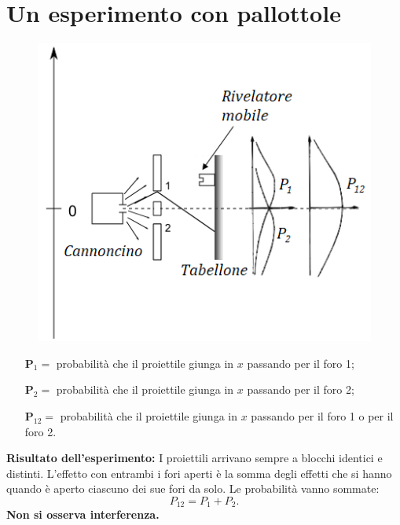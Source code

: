 \section*{Un esperimento con pallottole}
\begin{figure}[!htbp]
\begin{center}
\includegraphics[width=.6\textwidth]{immagini/cap_2/fig_2_1.png}
\end{center}
\end{figure}
\begin{itemize}
\item[\textbf{P$_1=$} ]probabilità che il proiettile giunga in $x$ passando per il foro 1;
\item[\textbf{P$_2=$} ]probabilità che il proiettile giunga in $x$ passando per il foro 2;
\item[\textbf{P$_{12}=$} ]probabilità che il proiettile giunga in $x$ passando per il foro 1 o per il foro 2.
\end{itemize}
\textbf{Risultato dell'esperimento:} I proiettili arrivano sempre a blocchi identici e distinti. L'effetto con entrambi i fori aperti è la somma degli effetti che si hanno quando è aperto ciascuno dei sue fori da solo. Le probabilità vanno sommate:
\begin{equation}
P_{12}=P_1+P_2.
\end{equation}
\textbf{Non si osserva interferenza.}
\newpage
